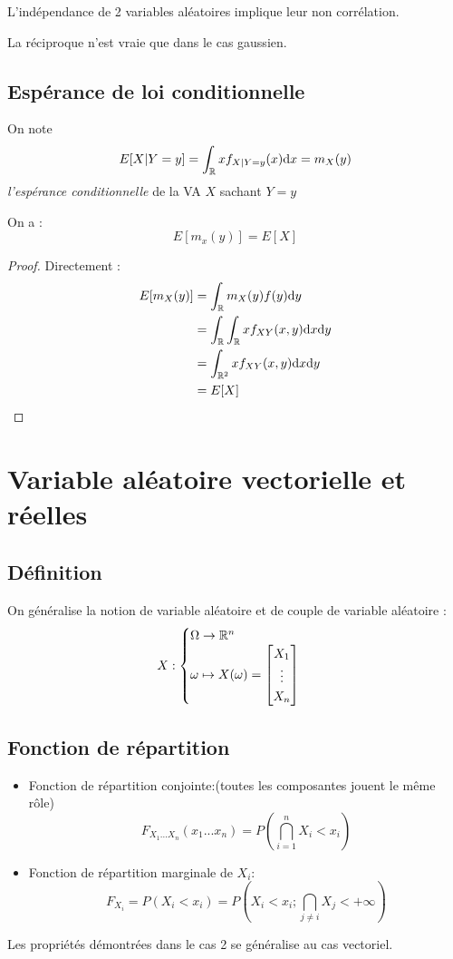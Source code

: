\documentclass[main.tex]{subfiles}
\begin{document}
\begin{thm}
  L'indépendance de 2 variables aléatoires implique leur non corrélation.

  La réciproque n'est vraie que dans le cas gaussien.
\end{thm}
\subsection{Espérance de loi conditionnelle}

\begin{defin}
  On note
  \[
    E[X|Y=y] = \int_{\mathbb{R}}^{}xf_{X|Y=y}(x)\mbox{d} x = m_X(y)
  \]
  \emph{l'espérance conditionnelle} de la VA $X$ sachant $Y=y$
\end{defin}
\begin{prop}
  On a :
  \[
    E[m_x(y)] = E[X]
  \]
\end{prop}
\begin{proof}
  Directement :
  \begin{align*}
    E[m_X(y)]&= \int_{\mathbb{R}}^{}m_X(y)f(y)\mbox{d} y\\
             &=\int_{\mathbb{R}}\int_{\mathbb{R}} x f_{XY}(x,y)\mbox{d} x\mbox{d} y\\
             &=\int_{\mathbb{R}^2}^{}x f_{XY}(x,y)\mbox{d} x\mbox{d} y\\
             &= E[X]
  \end{align*}
\end{proof}

\section{Variable aléatoire vectorielle et réelles}
\subsection{Définition}
\begin{defin}
  On généralise la notion de variable aléatoire et de couple de variable aléatoire :
  \[
    X :
    \begin{cases}
      \Omega \to \mathbb{R}^n\\
      \omega \mapsto X(\omega) =\begin{bmatrix} X_1\\ \vdots\\ X_n \end{bmatrix}
    \end{cases}
  \]
\end{defin}
\subsection{Fonction de répartition}
\begin{defin}
  \begin{itemize}
  \item Fonction de répartition conjointe:(toutes les composantes jouent le même rôle)
    \[
      F_{X_1...X_n}(x_1...x_n) = P \left(\bigcap_{i=1}^nX_i<x_i\right)
    \]
    \item Fonction de répartition marginale de $X_i$:
      \[
        F_{X_i}=P(X_i<x_i)= P\left(X_i<x_i ; \bigcap_{j\neq i}X_j< +\infty \right)
      \]
  \end{itemize}

Les propriétés démontrées dans le cas 2 se généralise au cas vectoriel.
\end{defin}
\end{document}
